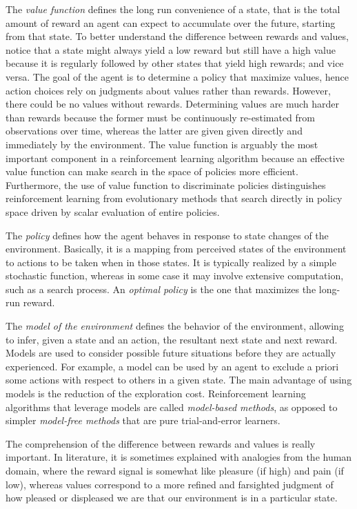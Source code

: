 The \textit{value function} defines the long run convenience of a state, that is the total amount of reward an agent can expect to accumulate over the future, starting from that state.
To better understand the difference between rewards and values, notice that a state might always yield a low reward but still have a high value because it is regularly followed by other states that yield high rewards; and vice versa.
The goal of the agent is to determine a policy that maximize values, hence action choices rely on judgments about values rather than rewards.
However, there could be no values without rewards.
Determining values are much harder than rewards because the former must be continuously re-estimated from observations over time, whereas the latter are given given directly and immediately by the environment.
The value function is arguably the most important component in a reinforcement learning algorithm because an effective value function can make search in the space of policies more efficient.
Furthermore, the use of value function to discriminate policies distinguishes reinforcement learning from evolutionary methods that search directly in policy space driven by scalar evaluation of entire policies.

The \textit{policy} defines how the agent behaves in response to state changes of the environment.
Basically, it is a mapping from perceived states of the environment to actions to be taken when in those states.
It is typically realized by a simple stochastic function, whereas in some case it may involve extensive computation, such as a search process. 
An \textit{optimal policy} is the one that maximizes the long-run reward.

The \textit{model of the environment} defines the behavior of the environment, allowing to infer, given a state and an action, the resultant next state and next reward.
Models are used to consider possible future situations before they are actually experienced. For example, a model can be used by an agent to exclude a priori some actions with respect to others in a given state.
The main advantage of using models is the reduction of the exploration cost.
Reinforcement learning algorithms that leverage models are called \textit{model-based methods}, as opposed to simpler \textit{model-free methods} that are pure trial-and-error learners.

The comprehension of the difference between rewards and values is really important.
In literature, it is sometimes explained with analogies from the human domain, where the reward signal is somewhat like pleasure (if high) and pain (if low), whereas values correspond to a more refined and farsighted judgment of how pleased or displeased we are that our environment is in a particular state.


